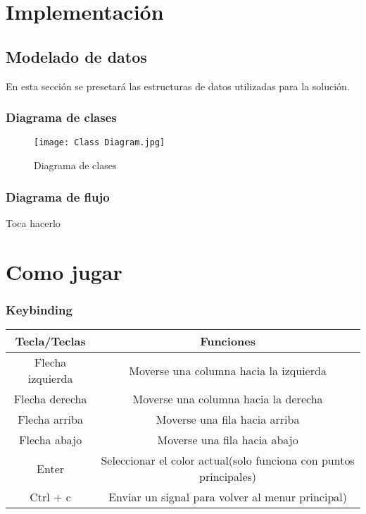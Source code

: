 \documentclass[letter]{article}
\begin{document}
\section{Implementaci\'on}
\subsection{Modelado de datos}
En esta secci\'on se presetar\'a las estructuras de datos utilizadas para la soluci\'on.
\subsubsection{Diagrama de clases}
\begin{figure}[H]
	\centerline{\texttt{[image: Class Diagram.jpg]}}
	\caption{Diagrama de clases}
	\label{fig}
\end{figure}
\newpage
\subsubsection{Diagrama de flujo}
Toca hacerlo
\section{Como jugar}
\subsubsection{Keybinding}
\begin{center}
	\begin{tabular}{ |c|c| }
		\hline
		\textbf{Tecla/Teclas} & \textbf{Funciones}                                                \\
		\hline
		Flecha izquierda      & Moverse una columna hacia la izquierda                            \\
		\hline
		Flecha derecha        & Moverse una columna hacia la derecha                              \\
		\hline
		Flecha arriba         & Moverse una fila hacia arriba                                     \\
		\hline
		Flecha abajo          & Moverse una fila hacia abajo                                      \\
		\hline
		Enter                 & Seleccionar el color actual(solo funciona con puntos principales) \\
		\hline
		Ctrl + c              & Enviar un signal para volver al menur principal)                  \\
		\hline
	\end{tabular}
\end{center}
\end{document}
